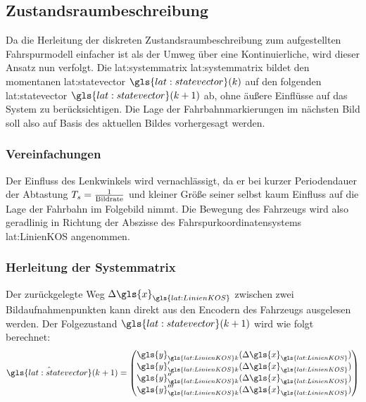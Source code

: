 \subsection{Zustandsraumbeschreibung}
Da die Herleitung der diskreten Zustandsraumbeschreibung zum aufgestellten Fahrspurmodell einfacher ist als der Umweg über eine Kontinuierliche, wird dieser Ansatz nun verfolgt.
Die \glsdesc{lat:systemmatrix} \gls{lat:systemmatrix} bildet den momentanen \glsdesc{lat:statevector} \(\gls{lat:statevector}(\scl{k})\) auf den folgenden \glsdesc{lat:statevector} \(\gls{lat:statevector}(\scl{k}+1)\) ab, ohne äußere Einflüsse auf das System zu berücksichtigen. Die Lage der Fahrbahnmarkierungen im nächsten Bild soll also auf Basis des aktuellen Bildes vorhergesagt werden.

\subsubsection{Vereinfachungen}
Der Einfluss des Lenkwinkels wird vernachlässigt, da er bei kurzer Periodendauer der Abtastung \(T_s = \frac{1}{\text{Bildrate}}\) und kleiner Größe seiner selbst kaum Einfluss auf die Lage der Fahrbahn im Folgebild nimmt. Die Bewegung des Fahrzeugs wird also geradlinig in Richtung der Abszisse des Fahrspurkoordinatensystems \gls{lat:LinienKOS} angenommen. 

\subsubsection{Herleitung der Systemmatrix}
Der zurückgelegte Weg \begin{math} \scl{\Delta\gls{x}}_{\gls{lat:LinienKOS}} \end{math} zwischen zwei Bildaufnahmenpunkten kann direkt aus den Encodern des Fahrzeugs ausgelesen werden. Der Folgezustand  \(\gls{lat:statevector}(\scl{k}+1)\) wird wie folgt berechnet:
\begin{equation}
\label{eq:nextstatemapping}
\hat{\gls{lat:statevector}}(\scl{k}+1) =
\begin{pmatrix}
\gls{y}_{\gls{lat:LinienKOS}\scl{k}}(\scl{\Delta\gls{x}}_{\gls{lat:LinienKOS}}) \\
\der{\gls{y}_{\gls{lat:LinienKOS}\scl{k}}}(\scl{\Delta\gls{x}}_{\gls{lat:LinienKOS}}) \\
\derII{\gls{y}_{\gls{lat:LinienKOS}\scl{k}}}(\scl{\Delta\gls{x}}_{\gls{lat:LinienKOS}}) \\
\derIII{\gls{y}_{\gls{lat:LinienKOS}\scl{k}}}(\scl{\Delta\gls{x}}_{\gls{lat:LinienKOS}}) \\
\end{pmatrix}
\end{equation}

